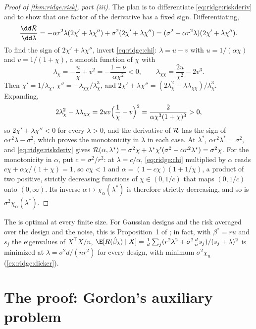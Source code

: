 \begin{refsection}
\begin{proof}[Proof of \cref{thm:ridge:risk}, part (iii)]
The plan is to differentiate \eqref{eq:ridge:riskderiv} and to show that one factor of the derivative has a fixed sign. Differentiating,
\[
\frac{\dd\ridgeR}{\dd\lambda}=-\alpha r^2\lambda(2\chi'+\lambda\chi'')+\sigma^2(2\chi'+\lambda\chi'')=(\sigma^2-\alpha r^2\lambda)(2\chi'+\lambda\chi'').
\]
To find the sign of $2\chi'+\lambda\chi''$, invert \eqref{eq:ridge:chi}: $\lambda=u-v$ with $u=1/(\alpha\chi)$ and $v=1/(1+\chi)$, a smooth function of $\chi$ with
\[
\lambda_\chi=-\frac u\chi+v^2=-\frac{1-\nu}{\alpha\chi^2}<0,\qquad\lambda_{\chi\chi}=\frac{2u}{\chi^2}-2v^3 .
\]
Then $\chi'=1/\lambda_\chi$, $\chi''=-\lambda_{\chi\chi}/\lambda_\chi^3$, and $2\chi'+\lambda\chi''=(2\lambda_\chi^2-\lambda\lambda_{\chi\chi})/\lambda_\chi^3$. Expanding,
\[
2\lambda_\chi^2-\lambda\lambda_{\chi\chi}=2uv\Bigl(\frac1\chi-v\Bigr)^2=\frac2{\alpha\chi^3(1+\chi)^3}>0,
\]
so $2\chi'+\lambda\chi''<0$ for every $\lambda>0$, and the derivative of $\mathcal{R}$ has the sign of $\alpha r^2\lambda-\sigma^2$, which proves the monotonicity in $\lambda$ in each case. At $\lambda^*$, $\alpha r^2\lambda^*=\sigma^2$, and \eqref{eq:ridge:riskderiv} gives $\mathcal{R}(\alpha,\lambda^*)=\sigma^2\chi+\lambda^*\chi'(\sigma^2-\alpha r^2\lambda^*)=\sigma^2\chi$. For the monotonicity in $\alpha$, put $c=\sigma^2/r^2$: at $\lambda=c/\alpha$, \eqref{eq:ridge:chi} multiplied by $\alpha$ reads $c\chi+\alpha\chi/(1+\chi)=1$, so $c\chi<1$ and $\alpha=(1-c\chi)(1+1/\chi)$, a product of two positive, strictly decreasing functions of $\chi\in(0,1/c)$ that maps $(0,1/c)$ onto $(0,\infty)$. Its inverse $\alpha\mapsto\chi_\alpha(\lambda^*)$ is therefore strictly decreasing, and so is $\sigma^2\chi_\alpha(\lambda^*)$.
\end{proof}

The  is optimal at every finite size. For Gaussian designs and the risk averaged over the design and the noise, this is Proposition~1 of \textcite{Dicker2016}; in fact, with $\beta^*=ru$ and $s_j$ the eigenvalues of $X^\top X/n$, $\E[R(\hat\beta_\lambda)\mid X]=\frac1d\sum_j(r^2\lambda^2+\sigma^2\frac dns_j)/(s_j+\lambda)^2$ is minimized at $\lambda=\sigma^2d/(nr^2)$ for every design, with minimum $\sigma^2\chi_n$ (\cref{ex:ridge:dicker}).

\section{The proof: Gordon's auxiliary problem}\label{sec:ridge:cgmt}


\end{refsection}
